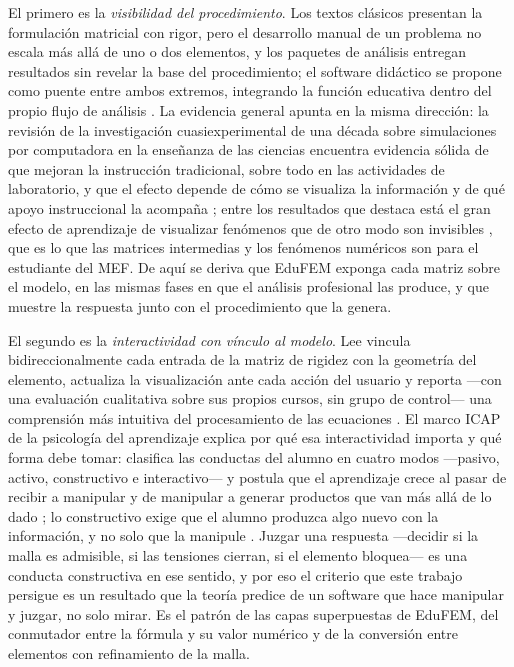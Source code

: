 El primero es la \emph{visibilidad del procedimiento}. Los textos clásicos presentan la formulación matricial con rigor, pero el desarrollo manual de un problema no escala más allá de uno o dos elementos, y los paquetes de análisis entregan resultados sin revelar la base del procedimiento; el software didáctico se propone como puente entre ambos extremos, integrando la función educativa dentro del propio flujo de análisis \autocites[p.~157]{lee2015interactive}[p.~872]{lee2015eigenmodes}[p.~2]{bishay2020teaching}. La evidencia general apunta en la misma dirección: la revisión de la investigación cuasiexperimental de una década sobre simulaciones por computadora en la enseñanza de las ciencias encuentra evidencia sólida de que mejoran la instrucción tradicional, sobre todo en las actividades de laboratorio, y que el efecto depende de cómo se visualiza la información y de qué apoyo instruccional la acompaña \autocite[p.~136]{rutten2012learning}; entre los resultados que destaca está el gran efecto de aprendizaje de visualizar fenómenos que de otro modo son invisibles \autocite[p.~151]{rutten2012learning}, que es lo que las matrices intermedias y los fenómenos numéricos son para el estudiante del MEF. De aquí se deriva que EduFEM exponga cada matriz sobre el modelo, en las mismas fases en que el análisis profesional las produce, y que muestre la respuesta junto con el procedimiento que la genera.

El segundo es la \emph{interactividad con vínculo al modelo}. Lee vincula bidireccionalmente cada entrada de la matriz de rigidez con la geometría del elemento, actualiza la visualización ante cada acción del usuario y reporta —con una evaluación cualitativa sobre sus propios cursos, sin grupo de control— una comprensión más intuitiva del procesamiento de las ecuaciones \autocites[pp.~158, 163, 166, 168]{lee2015interactive}[p.~874]{lee2015eigenmodes}. El marco ICAP de la psicología del aprendizaje explica por qué esa interactividad importa y qué forma debe tomar: clasifica las conductas del alumno en cuatro modos —pasivo, activo, constructivo e interactivo— y postula que el aprendizaje crece al pasar de recibir a manipular y de manipular a generar productos que van más allá de lo dado \autocite[p.~220]{chi2014icap}; lo constructivo exige que el alumno produzca algo nuevo con la información, y no solo que la manipule \autocite[p.~222]{chi2014icap}. Juzgar una respuesta —decidir si la malla es admisible, si las tensiones cierran, si el elemento bloquea— es una conducta constructiva en ese sentido, y por eso el criterio que este trabajo persigue es un resultado que la teoría predice de un software que hace manipular y juzgar, no solo mirar. Es el patrón de las capas superpuestas de EduFEM, del conmutador entre la fórmula y su valor numérico y de la conversión entre elementos con refinamiento de la malla.

